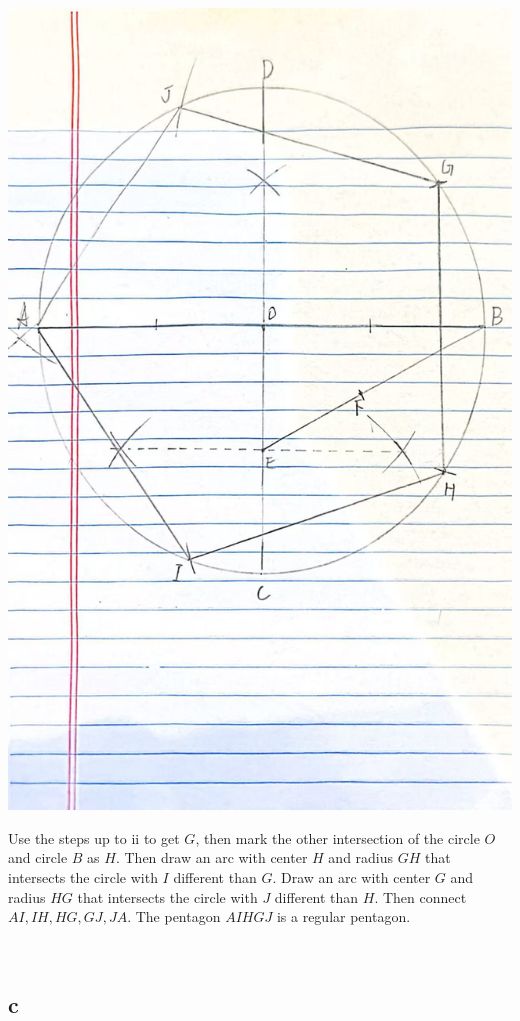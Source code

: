 \documentclass{article}
\begin{document}
~

\includegraphics[scale=0.1]{HW_0214/4biii.jpg}

Use the steps up to ii to get $G$, then mark the other intersection of the circle $O$ and circle $B$ as $H$. Then draw an arc with center $H$ and radius $GH$ that intersects the circle with $I$ different than $G$. Draw an arc with center $G$ and radius $HG$ that intersects the circle with $J$ different than $H$. Then connect $AI, IH,HG,GJ,JA$. The pentagon $AIHGJ$ is a regular pentagon.

~

\subsection*{c}
\end{document}
